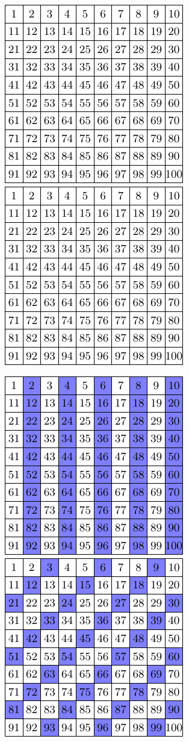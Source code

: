 \begin{center}
	\includegraphics{100ark} \qquad \qquad
	\includegraphics{100ark}
\end{center}
\newpage
\begin{center}
	\includegraphics{2} \qquad \qquad
	\includegraphics{3}
\end{center}
